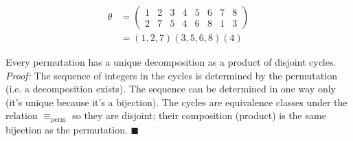 \begin{example}
\begin{align}
    \theta &= \begin{pmatrix}
1&2&3&4&5&6&7&8 \\
2&7&5&4&6&8&1&3
\end{pmatrix} \nonumber \\
&= (1,2,7)(3,5,6,8)(4) \nonumber
\end{align}
\end{example}
\begin{lemma}
Every permutation has a unique decomposition as a product of disjoint cycles. \\
\textit{Proof:} The sequence of integers in the cycles is determined by the permutation (i.e. a decomposition exists). The sequence can be determined in one way only (it's unique because it's a bijection). The cycles are equivalence classes under the relation $\equiv_{\text{perm}}$ so they are disjoint; their composition (product) is the same bijection as the permutation. $\blacksquare$
\end{lemma}

